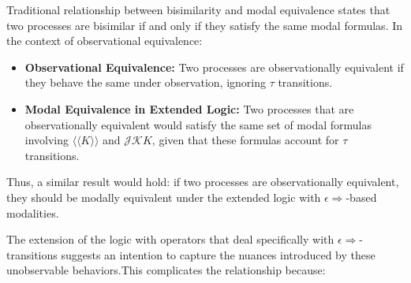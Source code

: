 \documentclass{article}
\begin{document}
Traditional relationship between bisimilarity and modal equivalence states that two processes are bisimilar if and only if they satisfy the same modal formulas. In the context of observational equivalence:
\begin{itemize}
    \item \textbf{Observational Equivalence:} Two processes are observationally equivalent if they behave the same under observation, ignoring $\tau$ transitions.
    \item \textbf{Modal Equivalence in Extended Logic:} Two processes that are observationally equivalent would satisfy the same set of modal formulas involving $\langle\langle K \rangle\rangle$ and $\mathcal{J}\mathcal{K} K$, given that these formulas account for $\tau$ transitions.
\end{itemize}

Thus, a similar result would hold: if two processes are observationally equivalent, they should be modally equivalent under the extended logic with $\epsilon \Rightarrow$-based modalities.

The extension of the logic with operators that deal specifically with $\epsilon\Rightarrow$-transitions suggests an intention to capture the nuances introduced by these unobservable behaviors.This complicates the relationship because:
\end{document}
